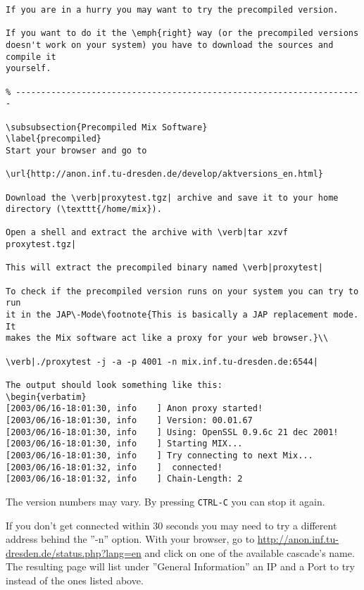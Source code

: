 \documentclass{article}
\begin{document}
\begin{verbatim}
If you are in a hurry you may want to try the precompiled version. 

If you want to do it the \emph{right} way (or the precompiled versions
doesn't work on your system) you have to download the sources and compile it
yourself.

% ---------------------------------------------------------------------

\subsubsection{Precompiled Mix Software}
\label{precompiled}
Start your browser and go to

\url{http://anon.inf.tu-dresden.de/develop/aktversions_en.html}

Download the \verb|proxytest.tgz| archive and save it to your home directory (\texttt{/home/mix}).

Open a shell and extract the archive with \verb|tar xzvf proxytest.tgz|

This will extract the precompiled binary named \verb|proxytest|

To check if the precompiled version runs on your system you can try to run
it in the JAP\-Mode\footnote{This is basically a JAP replacement mode. It
makes the Mix software act like a proxy for your web browser.}\\

\verb|./proxytest -j -a -p 4001 -n mix.inf.tu-dresden.de:6544|

The output should look something like this:
\begin{verbatim}
[2003/06/16-18:01:30, info    ] Anon proxy started!
[2003/06/16-18:01:30, info    ] Version: 00.01.67
[2003/06/16-18:01:30, info    ] Using: OpenSSL 0.9.6c 21 dec 2001!
[2003/06/16-18:01:30, info    ] Starting MIX...
[2003/06/16-18:01:30, info    ] Try connecting to next Mix...
[2003/06/16-18:01:32, info    ]  connected!
[2003/06/16-18:01:32, info    ] Chain-Length: 2
\end{verbatim}

The version numbers may vary. By pressing \verb|CTRL-C| you can stop it again.

If you don't get connected within 30 seconds you may need to try a different
address behind the ''-n'' option. With your browser, go to
\url{http://anon.inf.tu-dresden.de/status.php?lang=en} and click on one of
the available cascade's name. The resulting page will list under ''General
Information'' an IP and a Port to try instead of the ones listed above.
\end{document}
